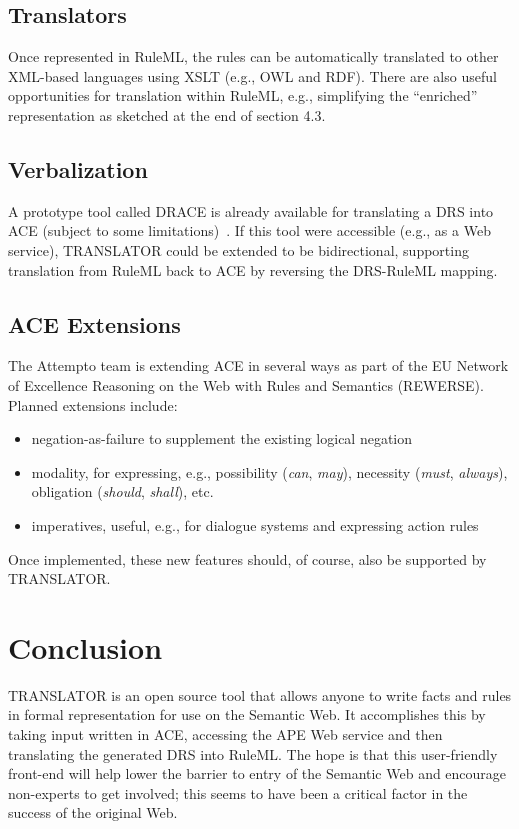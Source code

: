 \documentclass[12pt]{report}
\begin{document}
\section{Translators}
Once represented in RuleML, the rules can be automatically translated to other XML-based languages using XSLT (e.g., OWL and RDF). There are also useful opportunities for translation within RuleML, e.g., simplifying the ``enriched'' representation as sketched at the end of section 4.3.

\section{Verbalization}
A prototype tool called DRACE is already available for translating a DRS into ACE (subject to some limitations)~\cite{verbal}. If this tool were accessible (e.g., as a Web service), TRANSLATOR could be extended to be bidirectional, supporting translation from RuleML back to ACE by reversing the DRS-RuleML mapping.

\section{ACE Extensions}
The Attempto team is extending ACE in several ways as part of the EU Network of Excellence Reasoning on the Web with Rules and Semantics (REWERSE). Planned extensions include:
\begin{itemize}
\item
negation-as-failure to supplement the existing logical negation~\cite{naf}
\item
modality, for expressing, e.g., possibility (\textit{can}, \textit{may}), necessity (\textit{must}, \textit{always}), obligation (\textit{should}, \textit{shall}), etc.~\cite{modality}
\item
imperatives, useful, e.g., for dialogue systems and expressing action rules~\cite{flairs}
\end{itemize}

Once implemented, these new features should, of course, also be supported by TRANSLATOR.

\chapter{Conclusion}

TRANSLATOR is an open source tool that allows anyone to write facts and rules in formal representation for use on the Semantic Web. It accomplishes this by taking input written in ACE, accessing the APE Web service and then translating the generated DRS into RuleML. The hope is that this user-friendly front-end will help lower the barrier to entry of the Semantic Web and encourage non-experts to get involved; this seems to have been a critical factor in the success of the original Web.
\end{document}
